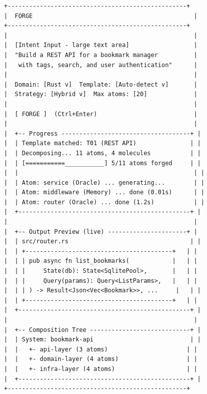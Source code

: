 \documentclass[11pt,a4paper,twoside]{article}
\begin{document}
\begin{lstlisting}[title={Forge View Layout}]
+--------------------------------------------------+
|  FORGE                                             |
+--------------------------------------------------+
|                                                    |
|  [Intent Input - large text area]                  |
|  "Build a REST API for a bookmark manager          |
|   with tags, search, and user authentication"      |
|                                                    |
|  Domain: [Rust v]  Template: [Auto-detect v]       |
|  Strategy: [Hybrid v]  Max atoms: [20]             |
|                                                    |
|  [ FORGE ]  (Ctrl+Enter)                           |
|                                                    |
|  +-- Progress ------------------------------------+ |
|  | Template matched: T01 (REST API)               | |
|  | Decomposing... 11 atoms, 4 molecules           | |
|  | [===========___________] 5/11 atoms forged     | |
|  |                                                 | |
|  | Atom: service (Oracle) ... generating...        | |
|  | Atom: middleware (Memory) ... done (0.01s)      | |
|  | Atom: router (Oracle) ... done (1.2s)           | |
|  +------------------------------------------------+ |
|                                                    |
|  +-- Output Preview (live) ----------------------+ |
|  | src/router.rs                                  | |
|  | +-----------------------------------------+   | |
|  | | pub async fn list_bookmarks(            |   | |
|  | |     State(db): State<SqlitePool>,       |   | |
|  | |     Query(params): Query<ListParams>,   |   | |
|  | | ) -> Result<Json<Vec<Bookmark>>, ...     |   | |
|  | +-----------------------------------------+   | |
|  +------------------------------------------------+ |
|                                                    |
|  +-- Composition Tree ----------------------------+ |
|  | System: bookmark-api                           | |
|  |   +- api-layer (3 atoms)                      | |
|  |   +- domain-layer (4 atoms)                   | |
|  |   +- infra-layer (4 atoms)                    | |
|  +------------------------------------------------+ |
+--------------------------------------------------+
\end{lstlisting}
\end{document}
